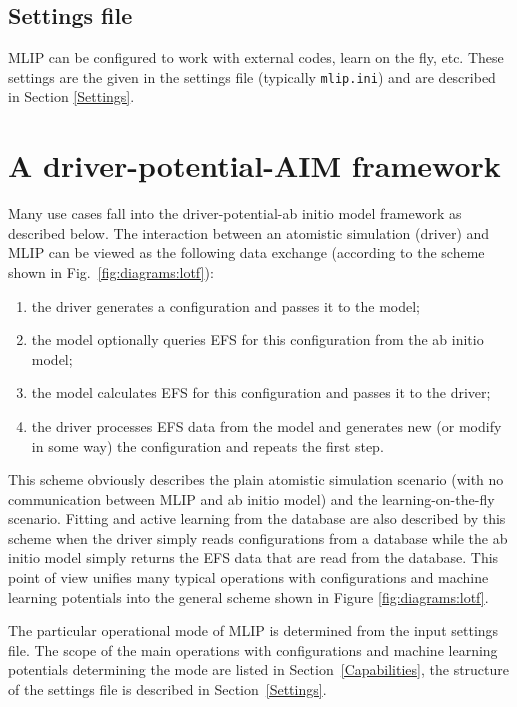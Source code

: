 \documentclass[12pt]{article}
\renewcommand{\_}{\char`_}
\begin{document}
\subsection{Settings file}
MLIP can be configured to work with external codes, learn on the fly, etc.
These settings are the given in the settings file (typically \texttt{mlip.ini}) and are described in Section \ref{Settings}.


\section{A driver-potential-AIM framework}\label{sec:aim}

Many use cases fall into the driver-potential-ab initio model framework as described below.
The interaction between an atomistic simulation (driver) and MLIP can be viewed as the following data exchange (according to the scheme shown in Fig.~\ref{fig:diagrams:lotf}): 
\begin{enumerate}
	\item the driver generates a configuration and passes it to the model;
	\item the model optionally queries EFS for this configuration from the ab initio model;
	\item the model calculates EFS for this configuration and passes it to the driver;
	\item the driver processes EFS data from the model and generates new (or modify in some way) the configuration and repeats the first step.
\end{enumerate}

This scheme obviously describes the plain atomistic simulation scenario (with no communication between MLIP and ab initio model) and the learning-on-the-fly scenario.
Fitting and active learning from the database are also described by this scheme when the driver simply reads configurations from a database while the ab initio model simply returns the EFS data that are read from the database.
This point of view unifies many typical operations with configurations and machine learning potentials into the general scheme shown in Figure \ref{fig:diagrams:lotf}. 

The particular operational mode of MLIP is determined from the input settings file. The scope of the main operations with configurations and machine learning potentials determining the mode are listed in Section~\ref{Capabilities}, the structure of the settings file is described in Section~\ref{Settings}. 
\end{document}
